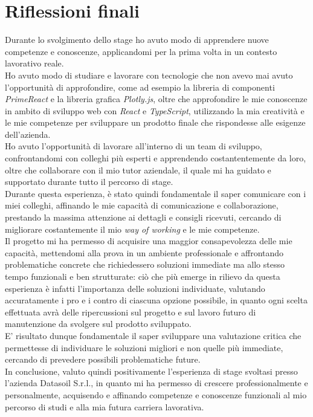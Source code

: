 \section{Riflessioni finali}
Durante lo svolgimento dello stage ho avuto modo di apprendere nuove competenze e conoscenze, applicandomi per la prima volta in un contesto lavorativo reale. \\
Ho avuto modo di studiare e lavorare con tecnologie che non avevo mai avuto l'opportunità di approfondire, come ad esempio la libreria di componenti \textit{PrimeReact} e la
libreria grafica \textit{Plotly.js}, oltre che approfondire le mie conoscenze in ambito di sviluppo web con \textit{React} e \textit{TypeScript}, utilizzando la mia
creatività e le mie competenze per sviluppare un prodotto finale che rispondesse alle esigenze dell'azienda. \\
Ho avuto l'opportunità di lavorare all'interno di un team di sviluppo, confrontandomi con colleghi più esperti e apprendendo costantentemente da loro, oltre che collaborare
con il mio tutor aziendale, il quale mi ha guidato e supportato durante tutto il percorso di stage. \\
Durante questa esperienza, è stato quindi fondamentale il saper comunicare con i miei colleghi, affinando le mie capacità di comunicazione e collaborazione, prestando la massima
attenzione ai dettagli e consigli ricevuti, cercando di migliorare costantemente il mio \textit{way of working} e le mie competenze. \\
Il progetto mi ha permesso di acquisire una maggior consapevolezza delle mie capacità, mettendomi alla prova in un ambiente professionale e affrontando problematiche concrete
che richiedessero soluzioni immediate ma allo stesso tempo funzionali e ben strutturate: ciò che più emerge in rilievo da questa esperienza è infatti l'importanza delle soluzioni individuate,
valutando accuratamente i pro e i contro di ciascuna opzione possibile, in quanto ogni scelta effettuata avrà delle ripercussioni sul progetto e sul lavoro futuro di manutenzione da svolgere
sul prodotto sviluppato. \\
E' risultato dunque fondamentale il saper sviluppare una valutazione critica che permettesse di individuare le soluzioni migliori e non quelle più immediate, cercando di prevedere
possibili problematiche future. \\
In conclusione, valuto quindi positivamente l'esperienza di stage svoltasi presso l'azienda Datasoil S.r.l., in quanto mi ha permesso di crescere professionalmente e personalmente,
acquisendo e affinando competenze e conoscenze funzionali al mio percorso di studi e alla mia futura carriera lavorativa.